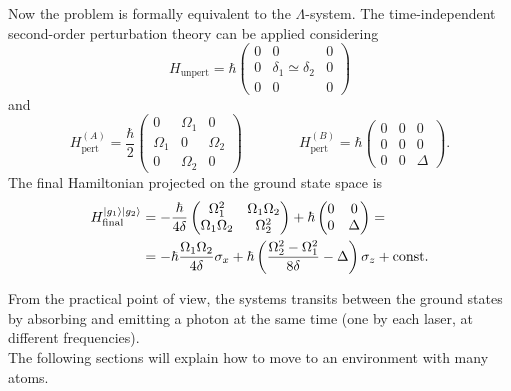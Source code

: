 \noindent Now the problem is formally equivalent to the $\Lambda$-system. The time-independent second-order perturbation theory can be applied considering
\begin{equation*}
H_\text{unpert} = \hbar \begin{pmatrix}
    0 & 0 & 0\\
    0 &\delta_1 \simeq \delta_2 & 0\\
    0 & 0 & 0
\end{pmatrix} 
\end{equation*}
and 
\begin{equation*}
H_\text{pert}^{(A)} = 
\frac{\hbar}{2}\begin{pmatrix}
    0&\Omega_1&0\\
    \Omega_1&0&\Omega_2\\
    0&\Omega_2&0
\end{pmatrix}
\qquad\qquad
H_\text{pert}^{(B)} = 
\hbar\begin{pmatrix}
    0 & 0 & 0\\
    0 & 0 & 0\\
    0 & 0 & \Delta
\end{pmatrix}.
\end{equation*}
The final Hamiltonian projected on the ground state space is 
\begin{equation*}
\begin{aligned}
H_\text{final}^{\ket{g_1}\ket{g_2}} &= -\frac{\hbar}{4\delta}
\begin{pmatrix}
\Omega_1^2 & \Omega_1\Omega_2\\
\Omega_1\Omega_2 & \Omega_2^2
\end{pmatrix} + \hbar
\begin{pmatrix}
    0&0\\
    0&\Delta
\end{pmatrix} = \\
&=
-\hbar \frac{\Omega_1\Omega_2}{4\delta}\sigma_x
+\hbar\left(
\frac{\Omega_2^2 - \Omega_1^2}{8\delta}-\Delta
\right) \sigma_z + \text{const}. 
\end{aligned}
\end{equation*}




From the practical point of view, the systems transits between the ground states by absorbing and emitting a photon at the same time (one by each laser, at different frequencies). \\

The following sections will explain how to move to an environment with many atoms. 
